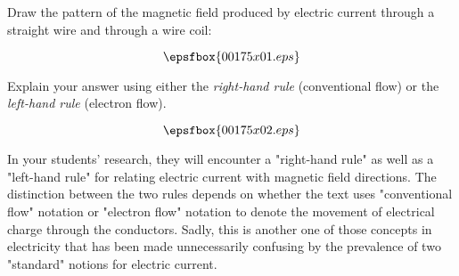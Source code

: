 

Draw the pattern of the magnetic field produced by electric current through a straight wire and through a wire coil:

$$\epsfbox{00175x01.eps}$$

Explain your answer using either the {\it right-hand rule} (conventional flow) or the {\it left-hand rule} (electron flow).







$$\epsfbox{00175x02.eps}$$







In your students' research, they will encounter a "right-hand rule" as well as a "left-hand rule" for relating electric current with magnetic field directions.  The distinction between the two rules depends on whether the text uses "conventional flow" notation or "electron flow" notation to denote the movement of electrical charge through the conductors.  Sadly, this is another one of those concepts in electricity that has been made unnecessarily confusing by the prevalence of two "standard" notions for electric current.




